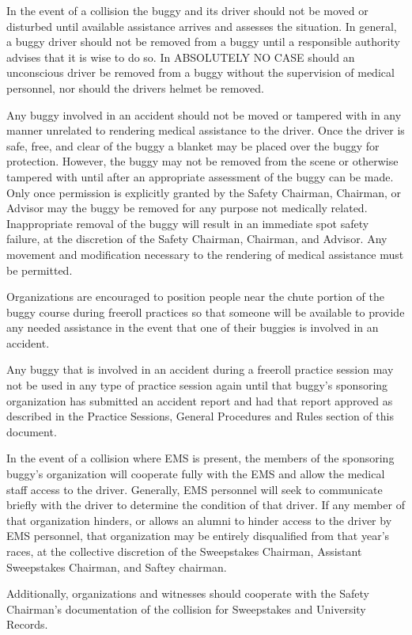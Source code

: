 	In the event of a collision the buggy and its driver should not be moved or
	disturbed until available assistance arrives and assesses the situation. In
	general, a buggy driver should not be removed from a buggy until a responsible
	authority advises that it is wise to do so. In ABSOLUTELY NO CASE should an
	unconscious driver be removed from a buggy without the supervision of medical
	personnel, nor should the drivers helmet be removed.
	
	Any buggy involved in an accident should not be moved or tampered with in any 
	manner unrelated to rendering medical assistance to the driver. Once the driver 
	is safe, free, and clear of the buggy a blanket may be placed over the buggy for
	protection. However, the buggy may not be removed from the scene or otherwise 
	tampered with until after an appropriate assessment of the buggy can be made. 
	Only once permission is explicitly granted by the Safety Chairman, Chairman, or 
	Advisor may the buggy be removed for any purpose not medically related. 
	Inappropriate removal of the buggy will result in an immediate spot safety 
	failure, at the discretion of the Safety Chairman, Chairman, and Advisor. 
	Any movement and modification necessary to the rendering of medical assistance 
	must be permitted.

	Organizations are encouraged to position people near the chute portion of the
	buggy course during freeroll practices so that someone will be available to
	provide any needed assistance in the event that one of their buggies is
	involved in an accident.

	Any buggy that is involved in an accident during a freeroll practice session
	may not be used in any type of practice session again until that buggy's
	sponsoring organization has submitted an accident report and had that report
	approved as described in the Practice Sessions, General Procedures and Rules
	section of this document.

	In the event of a collision where EMS is present, the members of the
	sponsoring buggy's organization will cooperate fully with the EMS and allow
	the medical staff access to the driver.  Generally, EMS personnel will seek
	to communicate briefly with the driver to determine the condition of that
	driver. If any member of that organization hinders, or allows an alumni to
	hinder access to the driver by EMS personnel, that organization may be
	entirely disqualified from that year's races, at the collective discretion
	of the Sweepstakes Chairman, Assistant Sweepstakes Chairman, and Saftey
	chairman.

	Additionally, organizations and witnesses should cooperate with the Safety
	Chairman's documentation of the collision for Sweepstakes and University
	Records.
	